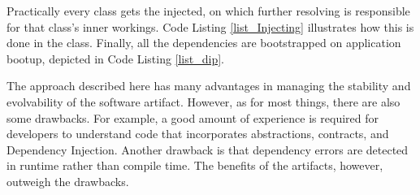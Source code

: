 Practically every class gets the 
injected, on which further resolving is responsible for that class's inner workings. Code
Listing \ref{list_Injecting} illustrates how this is done in the
 class. Finally, all the dependencies are
bootstrapped on application bootup, depicted in Code Listing \ref{list_dip}. 

The approach described here has many advantages in managing the stability and evolvability
of the software artifact. However, as for most things, there are also some drawbacks. For
example, a good amount of experience is required for developers to understand code that
incorporates abstractions, contracts, and Dependency Injection. Another drawback is that
dependency errors are detected in runtime rather than compile time. The benefits of the
artifacts, however, outweigh the drawbacks.